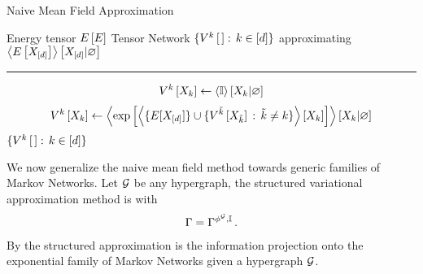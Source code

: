 \begin{algorithm}[h!]
    \caption{Naive Mean Field Approximation}\label{alg:NMF}
    \begin{algorithmic}
        \Require Energy tensor $E\left[E\right]$
        \Ensure Tensor Network $\{V^{k}\left[\,\right] : \, k\in[d]\}$ approximating $\left\langle E\left[X_{[d]}\right]\right\rangle \left[ X_{[d]} | \varnothing \right]$
        \hrule
        \For{$\catenumeratorin$}
            \State
            \begin{align*}
                V^{k}\left[X_{k}\right]
                \leftarrow \left\langle \mathbb{I}\right\rangle \left[ X_{k} | \varnothing \right]
            \end{align*}
        \EndFor
            \For{$\catenumeratorin$}
                \State
                \[ V^{k}\left[X_{k}\right]
                \leftarrow \left\langle  \mathrm{exp}\left[ \left\langle  \{E[X_{[d]}] \}\cup
                \{V^{\tilde{k}}\left[X_{\tilde{k}}\right] \, : \, \tilde{k}\neq k\} \right\rangle \left[ X_{k} \right] \right]
                \right\rangle \left[ X_{k} | \varnothing \right] \]
            \EndFor
        \EndWhile
        \Return $\{V^{k}\left[\,\right] : \, k\in[d]\}$
    \end{algorithmic}
\end{algorithm}




We now generalize the naive mean field method towards generic families of Markov Networks.
Let $\mathcal{G}$ be any hypergraph, the structured variational approximation method is  with
\begin{align*}
    \Gamma = \Gamma^{\phi^{\mathcal{G}},\mathbb{I}} \, .
\end{align*}
By  the structured approximation is the information projection  onto the exponential family of Markov Networks given a hypergraph $\mathcal{G}$.

